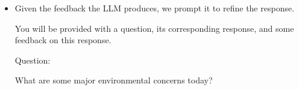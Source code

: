 \begin{itemize}
\begin{tcolorbox}
Major environmental concerns today include climate change, air and water pollution, deforestation, loss of biodiversity, and ocean degradation.

\vspace{0.5em}

Feedback:

\vspace{0.2em}

\uline{The response provided is accurate and highlights key environmental concerns. However, it would benefit from more specific and detailed descriptions of these concerns. Here are suggestions for improvement:}

\vspace{0.2em}

\hspace{1em} \uline{1. Include specific examples of environmental issues.}

\vspace{0.1em}

\hspace{1em} \uline{2. Add information about major pollutants.}

\vspace{0.1em}

\hspace{1em} \uline{3. Specify the regions most affected.}

\endgroup

\end{tcolorbox}
\vspace{0.5em}


\item Given the feedback the LLM produces, we prompt it to refine the response.

\vspace{0.5em}
\begin{tcolorbox}

\begingroup
\setlength{\leftskip}{2em}
\setlength{\rightskip}{2em}

You will be provided with a question, its corresponding response, and some feedback on this response.

\vspace{0.5em}

Question:

\vspace{0.2em}

What are some major environmental concerns today?

\vspace{0.5em}


\end{tcolorbox}
\end{itemize}
